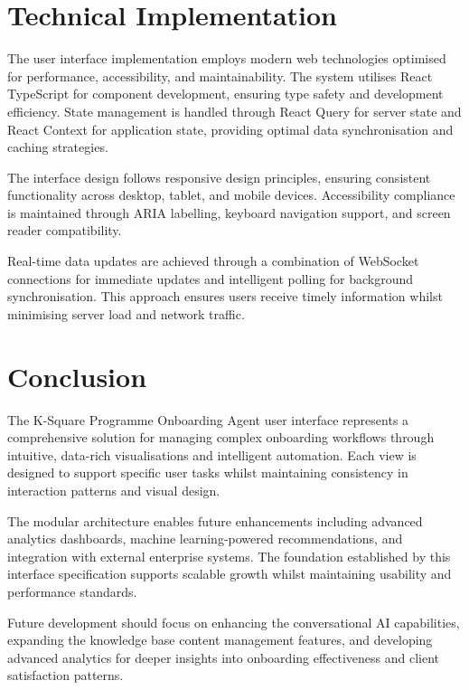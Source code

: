 \documentclass{article}
\begin{document}
\section{Technical Implementation}
The user interface implementation employs modern web technologies optimised for performance, accessibility, and maintainability. The system utilises React TypeScript for component development, ensuring type safety and development efficiency. State management is handled through React Query for server state and React Context for application state, providing optimal data synchronisation and caching strategies.

The interface design follows responsive design principles, ensuring consistent functionality across desktop, tablet, and mobile devices. Accessibility compliance is maintained through ARIA labelling, keyboard navigation support, and screen reader compatibility.

Real-time data updates are achieved through a combination of WebSocket connections for immediate updates and intelligent polling for background synchronisation. This approach ensures users receive timely information whilst minimising server load and network traffic.

\section{Conclusion}
The K-Square Programme Onboarding Agent user interface represents a comprehensive solution for managing complex onboarding workflows through intuitive, data-rich visualisations and intelligent automation. Each view is designed to support specific user tasks whilst maintaining consistency in interaction patterns and visual design.

The modular architecture enables future enhancements including advanced analytics dashboards, machine learning-powered recommendations, and integration with external enterprise systems. The foundation established by this interface specification supports scalable growth whilst maintaining usability and performance standards.

Future development should focus on enhancing the conversational AI capabilities, expanding the knowledge base content management features, and developing advanced analytics for deeper insights into onboarding effectiveness and client satisfaction patterns.

\end{document}
